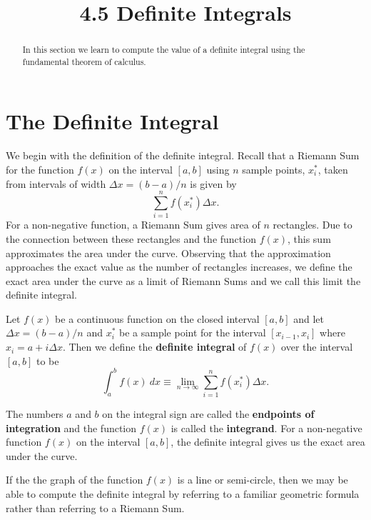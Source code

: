 \documentclass{ximera}
\title{4.5 Definite Integrals}
\begin{document}
\begin{abstract}
In this section we learn to compute the value of a definite integral using the fundamental theorem of calculus.
\end{abstract}

\maketitle



\section{The Definite Integral}

We begin with the definition of the definite integral.
Recall that a Riemann Sum for the function $f(x)$ on the interval $[a,b]$ using $n$ sample points, $x_i^*$, taken from intervals of width $\Delta x = (b-a)/n$ is given by
\[\sum_{i = 1}^n f(x_i^*)\Delta x.\]
For a non-negative function, a Riemann Sum gives area of $n$ rectangles. Due to the connection between these rectangles and the function $f(x)$,
this sum approximates the area under the curve.  Observing that the approximation approaches the exact value as the number of rectangles increases,
we define the exact area under the curve as a limit of Riemann Sums and we call this limit the definite integral.

\begin{definition}
Let $f(x)$ be a continuous function on the closed interval $[a,b]$ and let 
$\Delta x = (b-a)/n$ and $x_i^*$ be a sample point for the interval $[x_{i-1}, x_i]$ where $x_i = a+i\Delta x$. Then we define the \textbf{definite integral} of $f(x)$ over the interval $[a,b]$ to be
\[\int_a^b f(x) \ dx \equiv \lim_{n\to \infty} \sum_{i=1}^n f(x_i^*)\Delta x.\]
\end{definition} 
The numbers $a$ and $b$ on the integral sign
are called the \textbf{endpoints of integration} and the function $f(x)$ is called the \textbf{integrand}.  
For a non-negative function $f(x)$ on the interval $[a,b]$, the definite integral gives us the exact area under the curve.

If the the graph of the function $f(x)$ is a line or semi-circle, then we may be able to compute the definite integral 
by referring to a familiar geometric formula rather than referring to a Riemann Sum.

\end{document}
